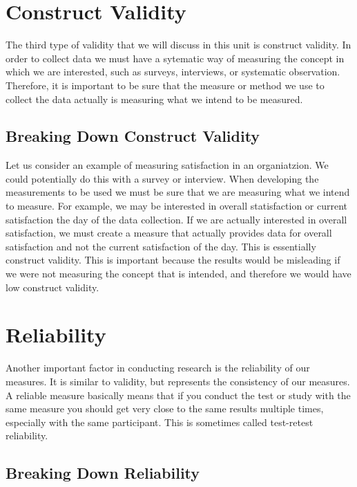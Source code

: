 \documentclass[]{book}
\theoremstyle{definition}
\theoremstyle{definition}
\theoremstyle{definition}
\theoremstyle{remark}
\begin{document}
\hypertarget{construct-validity}{%
\section{Construct Validity}\label{construct-validity}}

The third type of validity that we will discuss in this unit is
construct validity. In order to collect data we must have a sytematic
way of measuring the concept in which we are interested, such as
surveys, interviews, or systematic observation. Therefore, it is
important to be sure that the measure or method we use to collect the
data actually is measuring what we intend to be measured.

\hypertarget{breaking-down-construct-validity}{%
\subsection{Breaking Down Construct
Validity}\label{breaking-down-construct-validity}}

Let us consider an example of measuring satisfaction in an organiatzion.
We could potentially do this with a survey or interview. When developing
the measurements to be used we must be sure that we are measuring what
we intend to measure. For example, we may be interested in overall
statisfaction or current satisfaction the day of the data collection. If
we are actually interested in overall satisfaction, we must create a
measure that actually provides data for overall satisfaction and not the
current satisfaction of the day. This is essentially construct validity.
This is important because the results would be misleading if we were not
measuring the concept that is intended, and therefore we would have low
construct validity.

\hypertarget{reliability}{%
\section{Reliability}\label{reliability}}

Another important factor in conducting research is the reliability of
our measures. It is similar to validity, but represents the consistency
of our measures. A reliable measure basically means that if you conduct
the test or study with the same measure you should get very close to the
same results multiple times, especially with the same participant. This
is sometimes called test-retest reliability.

\hypertarget{breaking-down-reliability}{%
\subsection{Breaking Down Reliability}\label{breaking-down-reliability}}
\end{document}
